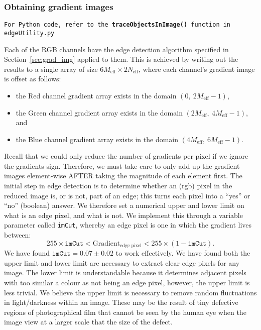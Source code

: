 \documentclass[11pt]{article}
\begin{document}
\subsubsection{Obtaining gradient images}
\begin{center}
\texttt{For Python code, refer to the {\bf traceObjectsInImage()} function in edgeUtility.py}
\end{center}
Each of the RGB channels have the edge detection algorithm specified in Section~\ref{sec:grad_img} applied to them. This is achieved by writing out the results to a single array of size $6M_{\text{eff}} \times 2N_{\text{eff}}$, where each channel's gradient image is offset as follows:
\begin{itemize}
  \item the Red channel gradient array exists in the domain $(0,~2M_{\text{eff}}-1)$,
  \item the Green channel gradient array exists in the domain $(2M_{\text{eff}},~4M_{\text{eff}}-1)$, and
  \item the Blue channel gradient array exists in the domain $(4M_{\text{eff}},~6M_{\text{eff}}-1)$.
\end{itemize}
Recall that we could only reduce the number of gradients per pixel if we ignore the gradients sign. Therefore, we must take care to only add up the gradient images element-wise AFTER taking the magnitude of each element first. The initial step in edge detection is to determine whether an (rgb) pixel in the reduced image is, or is not, part of an edge; this turns each pixel into a ``yes'' or ``no'' (boolean) answer. We therefore set a numerical upper and lower limit on what is an edge pixel, and what is not. We implement this through a variable parameter called \texttt{imCut}, whereby an edge pixel is one in which the gradient lives between:
\begin{equation}
255\times \texttt{imCut}< \text{Gradient}_{\text{edge pixel}} < 255\times (1-\texttt{imCut})\text{.}
\end{equation}
We have found $\texttt{imCut} = 0.07 \pm 0.02$ to work effectively. We have found both the upper limit and lower limit are necessary to extract clear edge pixels for any image. The lower limit is understandable because it determines adjacent pixels with too similar a colour as not being an edge pixel, however, the upper limit is less trivial. We believe the upper limit is necessary to remove random fluctuations in light/darkness within an image. These may be the result of tiny defective regions of photographical film that cannot be seen by the human eye when the image view at a larger scale that the size of the defect.
\end{document}
